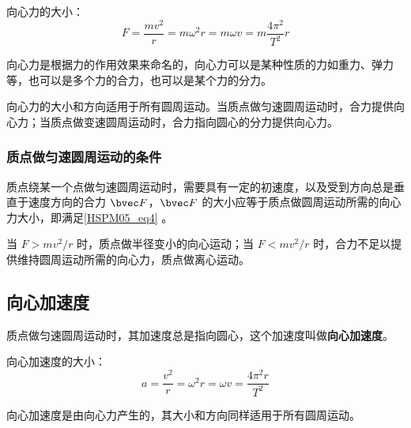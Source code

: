 向心力的大小：
\begin{equation}\label{HSPM05_eq4}
F=\frac{mv^2}{r}=m\omega^2r=m\omega v=m\frac{4\pi^2}{T^2}r
\end{equation}

向心力是根据力的作用效果来命名的，向心力可以是某种性质的力如重力、弹力等，也可以是多个力的合力，也可以是某个力的分力。

向心力的大小和方向适用于所有圆周运动。当质点做匀速圆周运动时，合力提供向心力；当质点做变速圆周运动时，合力指向圆心的分力提供向心力。

\subsubsection{质点做匀速圆周运动的条件}

质点绕某一个点做匀速圆周运动时，需要具有一定的初速度，以及受到方向总是垂直于速度方向的合力 $\bvec F$，$\bvec F$ 的大小应等于质点做圆周运动所需的向心力大小，即满足\autoref{HSPM05_eq4} 。

当 $F>mv^2/r$ 时，质点做半径变小的向心运动；当 $F<mv^2/r$ 时，合力不足以提供维持圆周运动所需的向心力，质点做离心运动。

\subsection{向心加速度}

质点做匀速圆周运动时，其加速度总是指向圆心，这个加速度叫做\textbf{向心加速度}。

向心加速度的大小：
\begin{equation}
a=\frac{v^2}{r}=\omega^2r=\omega v=\frac{4\pi^2r}{T^2}
\end{equation}

向心加速度是由向心力产生的，其大小和方向同样适用于所有圆周运动。
